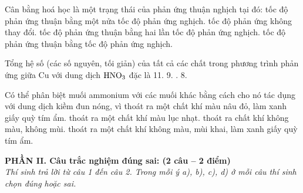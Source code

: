 \documentclass[12pt,a4paper]{article}
\begin{document}
\begin{ex}
Cân bằng hoá học là một trạng thái của phản ứng thuận nghịch tại đó:
\choice
{tốc độ phản ứng thuận bằng một nửa tốc độ phản ứng nghịch.}
{tốc độ phản ứng không thay đổi.}
{tốc độ phản ứng thuận bằng hai lần tốc độ phản ứng nghịch.}
{\True tốc độ phản ứng thuận bằng tốc độ phản ứng nghịch.}
\end{ex}

\begin{ex}
Tổng hệ số (các số nguyên, tối giản) của tất cả các chất trong phương trình phản ứng giữa Cu với dung dịch $\ce{HNO3}$ đặc là
\choice
{11.}
{9.}
{.}
{8.}
\end{ex}

\begin{ex}
Có thể phân biệt muối ammonium với các muối khác bằng cách cho nó tác dụng với dung dịch kiềm đun nóng, vì
\choice
{thoát ra một chất khí màu nâu đỏ, làm xanh giấy quỳ tím ẩm.}
{thoát ra một chất khí màu lục nhạt.}
{thoát ra chất khí không màu, không mùi.}
{\True thoát ra một chất khí không màu, mùi khai, làm xanh giấy quỳ tím ẩm.}
\end{ex}


\bigskip
\noindent
\textbf{PHẦN II. Câu trắc nghiệm đúng sai: (2 câu -- 2 điểm)}\\
\textit{Thí sinh trả lời từ câu 1 đến câu 2. Trong mỗi ý a), b), c), d) ở mỗi câu thí sinh chọn đúng hoặc sai.}
\end{document}
